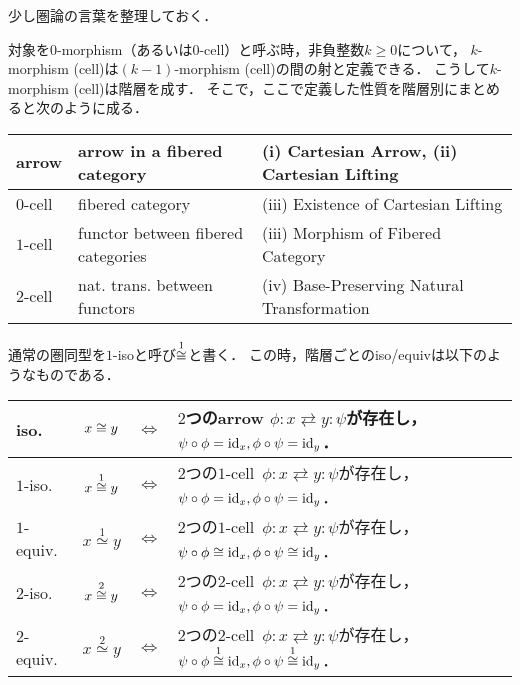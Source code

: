 \documentclass[a4paper, dvipdfmx]{jsarticle}
\newcommand{\kiso}[1][{}]{\overset{#1}{\iso}}
\newcommand{\kequiv}[1][{}]{\overset{#1}{\simeq}}
\begin{document}
\begin{Remark}
    少し圏論の言葉を整理しておく．

    対象を$0$-morphism（あるいは$0$-cell）と呼ぶ時，非負整数$k \geq 0$について，
    $k$-morphism (cell)は$(k-1)$-morphism (cell)の間の射と定義できる．
    こうして$k$-morphism (cell)は階層を成す．
    そこで，ここで定義した性質を階層別にまとめると次のように成る．
    \begin{center}
    \begin{tabular}{l|l|l}
        \hline
        arrow& arrow in a fibered category & (i) Cartesian Arrow, (ii) Cartesian Lifting \\ \hline\hline
        $0$-cell& fibered category & (iii) Existence of Cartesian Lifting \\ \hline
        $1$-cell& functor between fibered categories & (iii) Morphism of Fibered Category \\ \hline
        $2$-cell& nat. trans. between functors & (iv) Base-Preserving Natural Transformation \\
        \hline
    \end{tabular}
    \end{center}

    通常の圏同型を$1$-isoと呼び$\kiso[1]$と書く．
    この時，階層ごとのiso/equivは以下のようなものである．
    \begin{center}
        \begin{tabular}{lccl}
            iso. & $x \iso y$& $\iff$ &
                $2$つのarrow $\phi \colon x \rightleftarrows y \colon \psi$が存在し， 
                $\psi \circ \phi=\id[x], \phi \circ \psi=\id[y]$．\\ \hline\hline
            $1$-iso. & $x \kiso[1] y$& $\iff$ &
                $2$つの$1$-cell \,$\phi \colon x \rightleftarrows y \colon \psi$が存在し， 
                $\psi \circ \phi=\id[x], \phi \circ \psi=\id[y]$．\\
            $1$-equiv. & $x \kequiv[1] y$& $\iff$ &
                $2$つの$1$-cell \,$\phi \colon x \rightleftarrows y \colon \psi$が存在し， 
                $\psi \circ \phi \kiso \id[x], \phi \circ \psi \kiso \id[y]$．\\ \hline
            $2$-iso. & $x \kiso[2] y$& $\iff$ &
                $2$つの$2$-cell \,$\phi \colon x \rightleftarrows y \colon \psi$が存在し， 
                $\psi \circ \phi=\id[x], \phi \circ \psi=\id[y]$．\\
            $2$-equiv. & $x \kequiv[2] y$& $\iff$ &
                $2$つの$2$-cell \,$\phi \colon x \rightleftarrows y \colon \psi$が存在し， 
                $\psi \circ \phi \kiso[1] \id[x], \phi \circ \psi \kiso[1] \id[y]$．\\
        \end{tabular}
    \end{center}
\end{Remark}
\end{document}
